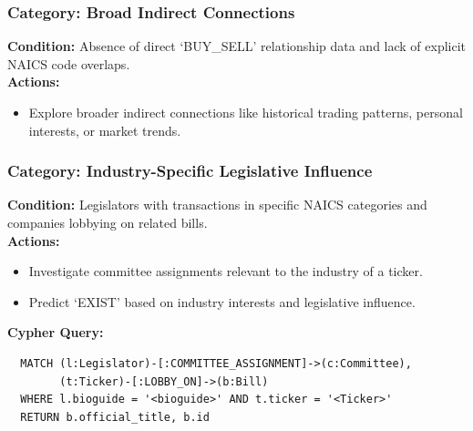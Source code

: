\documentclass[15pt,letterpaper]{article}
\begin{document}
\begin{mdframed}
  \subsubsection*{Category: Broad Indirect Connections}
  \textbf{Condition:} Absence of direct `BUY\_SELL' relationship data and lack of explicit NAICS code overlaps.
  \\ \textbf{Actions:}
  \begin{itemize}
      \item Explore broader indirect connections like historical trading patterns, personal interests, or market trends.
  \end{itemize}
  
  \subsubsection*{Category: Industry-Specific Legislative Influence}
  \textbf{Condition:} Legislators with transactions in specific NAICS categories and companies lobbying on related bills.
  \\\textbf{Actions:}
  \begin{itemize}
      \item Investigate committee assignments relevant to the industry of a ticker.
      \item Predict `EXIST' based on industry interests and legislative influence.
  \end{itemize}
  \textbf{Cypher Query:} 
  \begin{verbatim}
  MATCH (l:Legislator)-[:COMMITTEE_ASSIGNMENT]->(c:Committee), 
        (t:Ticker)-[:LOBBY_ON]->(b:Bill)
  WHERE l.bioguide = '<bioguide>' AND t.ticker = '<Ticker>' 
  RETURN b.official_title, b.id
  \end{verbatim}
  
  \end{mdframed}

  \vspace{5mm} %
\end{document}
